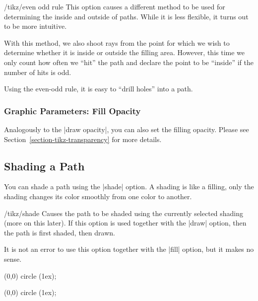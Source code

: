 \begin{key}{/tikz/even odd rule}
  This option causes a different method to be used for determining the
  inside and outside of paths. While it is less flexible, it turns out
  to be more intuitive.

  With this method, we also shoot rays from the point for which we
  wish to determine whether it is inside or outside the filling
  area. However, this time we only count how often we ``hit'' the path
  and declare the point to be ``inside'' if the number of hits is odd.

  Using the even-odd rule, it is easy to ``drill holes'' into a path.
  
\begin{codeexample}[]
\end{codeexample}
\end{key}



\subsubsection{Graphic Parameters: Fill Opacity}

\label{section-fill-opacity}
Analogously to the |draw opacity|, you can also set the filling
opacity. Please see Section~\ref{section-tikz-transparency} for more
details. 


\subsection{Shading a Path}

You can shade a path using the |shade| option. A shading is like a
filling, only the shading changes its color smoothly from one color to
another.

\begin{key}{/tikz/shade}
  Causes the path to be shaded using the currently selected shading
  (more on this later). If this option is used together with the
  |draw| option, then the path is first shaded, then drawn.

  It is not an error to use this option together with the |fill|
  option, but it makes no sense.

\begin{codeexample}[]
\tikz \shade (0,0) circle (1ex);
\end{codeexample}

\begin{codeexample}[]
\tikz \shadedraw (0,0) circle (1ex);
\end{codeexample}
\end{key}

